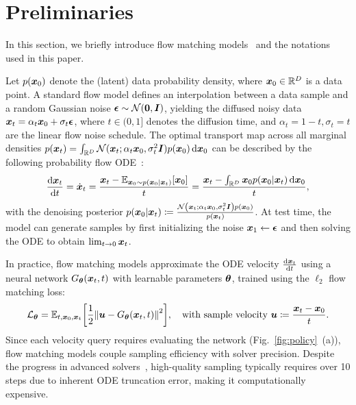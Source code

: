 \section{Preliminaries}
\label{sec:preliminaries}

In this section, we briefly introduce flow matching models~\citep{lipman2023flow, liu2022flow} 
and the notations used in this paper. 

Let $p({\bm{x}}_0)$ denote the (latent) data probability density, where ${\bm{x}}_0 \in \mathbb{R}^D$ is a data point. A standard flow model defines an interpolation between a data sample and a random Gaussian noise $\bm{\epsilon} \sim \mathcal{N}(\bm{0}, {\bm{I}})$, yielding the diffused noisy data ${\bm{x}}_t=\alpha_t {\bm{x}}_0 + \sigma_t \bm{\epsilon}$, where $t \in (0, 1]$ denotes the diffusion time, and $\alpha_t = 1 - t, \sigma_t = t$ are the linear flow noise schedule. The optimal transport map across all marginal densities $p({\bm{x}}_t) = \int_{\mathbb{R}^D} \mathcal{N}({\bm{x}}_t; \alpha_t {\bm{x}}_0, \sigma_t^2 {\bm{I}}) p({\bm{x}}_0) \mathop{}\!\mathrm{d} {\bm{x}}_0$ can be described by the following probability flow ODE~\citep{song2021scorebased,liu2022rectifiedflowmarginalpreserving}:
\begin{equation}
    \frac{\mathop{}\!\mathrm{d} {\bm{x}}_t}{\mathop{}\!\mathrm{d} t} = \dot{{\bm{x}}}_t = \frac{{\bm{x}}_t - \mathbb{E}_{{\bm{x}}_0 \sim p({\bm{x}}_0 | {\bm{x}}_t)} [{\bm{x}}_0]}{t} = \frac{{\bm{x}}_t - \int_{\mathbb{R}^D} {\bm{x}}_0 p( {\bm{x}}_0 | {\bm{x}}_t) \mathop{}\!\mathrm{d} {\bm{x}}_0}{t},
    \label{eq:pf_ode}
\end{equation}
with the denoising posterior $p(\vx_0 | \vx_t) \coloneqq \frac{\mathcal{N}\left(\vx_t; \alpha_t \vx_0, \sigma_t^2 \mI\right) p(\vx_0)}{p(\vx_t)}$.
At test time, the model can generate samples by first initializing the noise ${\bm{x}}_1 \gets \bm{\epsilon}$ and then solving the ODE to obtain $\lim_{t\to0}{\bm{x}}_t$. 

In practice, flow matching models approximate the ODE velocity $\frac{\mathop{}\!\mathrm{d} {\bm{x}}_t}{\mathop{}\!\mathrm{d} t}$ using a neural network $G_{\bm{\theta}}({\bm{x}}_t,t)$ with learnable parameters ${\bm{\theta}}$, trained using the $\ell_2$ flow matching loss:
\begin{equation}
    \mathcal{L}_\vtheta = \E_{t,\vx_0,\vx_t} \left[ \frac{1}{2} \left\| \vu - G_\vtheta(\vx_t,t) \right\|^2 \right], \quad \text{with sample velocity}\ \vu \coloneqq \frac{\vx_t - \vx_0}{t}.
    \label{eq:l2fm}
\end{equation}
Since each velocity query requires evaluating the network (Fig.~\ref{fig:policy}~(a)), flow matching models couple sampling efficiency with solver precision. Despite the progress in advanced solvers~\citep{Karras2022edm,deis,dpmsolver,dpmpp,unipc}, high-quality sampling typically requires over 10 steps due to inherent ODE truncation error, making it computationally expensive.

